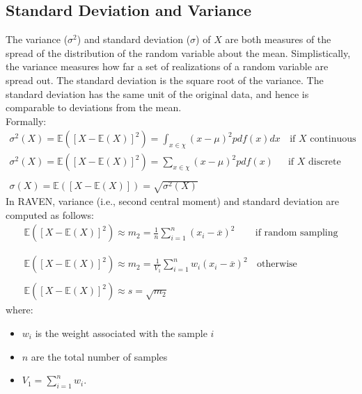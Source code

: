 \subsection{Standard Deviation and Variance}
The variance ($\sigma^{2}$) and standard deviation ($\sigma$) of $X$ are both measures of the spread of the distribution of the random variable about the
mean. Simplistically, the variance measures how far a set of realizations of a random variable are spread out.
The standard deviation is the square root of the variance. The standard deviation has the same unit of the original data, and hence is comparable to deviations from the mean.
\\Formally:
\begin{equation}
  \begin{matrix}
  \sigma^{2}(X)= \mathbb{E}\left(\left[X - \mathbb{E}(X)\right]^{2}\right) = \int_{x \in \chi} (x - \mu)^2 pdf(x) dx  & \,\text{if $X$ continuous} \\
  \sigma^{2}(X)= \mathbb{E}\left(\left[X - \mathbb{E}(X)\right]^{2}\right)  = \sum_{x \in \chi} (x - \mu)^2 pdf(x)  & \text{if  $X$ discrete}
  \\
  \\
  \sigma(X)= \mathbb{E}\left(\left[X - \mathbb{E}(X)\right]\right)  = \sqrt{\sigma^{2}(X)}
  \end{matrix}
\end{equation}
In RAVEN, variance (i.e., second central moment) and standard deviation are computed as follows:
\begin{equation}
\begin{matrix}
\mathbb{E}\left(\left[X - \mathbb{E}(X)\right]^{2}\right)  \approx  m_{2} = \frac{1}{n} \sum_{i=1}^{n}  (x_{i} - \overline{x})^{2} & \text{if  random sampling} \\
\\
\\
\mathbb{E}\left(\left[X - \mathbb{E}(X)\right]^{2}\right)  \approx m_{2}  = \frac{1}{V_{1}} \sum_{i=1}^{n} w_{i}  (x_{i} - \overline{x})^{2}  & \, \text{otherwise}
\\
\\
\mathbb{E}\left(\left[X - \mathbb{E}(X)\right]^{2}\right)  \approx s  =  \sqrt{m_{2}}
\end{matrix}
\end{equation}
where:
\begin{itemize}
  \item $w_{i}$ is the weight associated with the sample $i$
  \item $n$ are the total number of samples
  \item $V_{1} = \sum_{i=1}^{n} w_{i}$.
\end{itemize}
